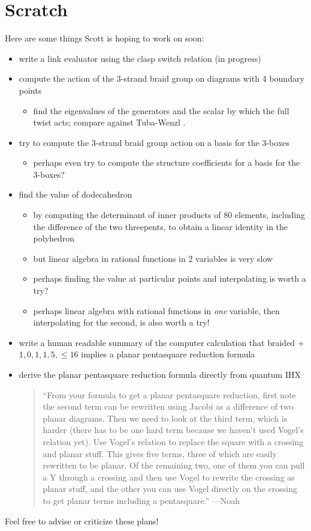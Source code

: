 \documentclass[12pt]{amsart}
\begin{document}
\section{Scratch}
Here are some things Scott is hoping to work on soon:
\begin{itemize}
\item write a link evaluator using the clasp switch relation (in progress)
\item compute the action of the 3-strand braid group on diagrams with 4
boundary points
\begin{itemize}
\item find the eigenvalues of the generators and the scalar by which the full twist
acts; compare against Tuba-Wenzl \cite{MR1815266}.
\end{itemize}
\item try to compute the 3-strand braid group action on a basis for the 3-boxes
\begin{itemize}
\item perhaps even try to compute the structure coefficients for a basis for
the 3-boxes?
\end{itemize}
\item find the value of dodecahedron
\begin{itemize}
\item by computing the determinant of inner
products of 80 elements, including the difference of the two threepents, to
obtain a linear identity in the polyhedron
\item but linear algebra in
rational functions in 2 variables is very slow
\item perhaps finding the value at particular points and interpolating is worth
a try?
\item perhaps linear algebra with rational functions in \emph{one} variable,
then interpolating for the second, is also worth a try!
\end{itemize}
\item write a human readable summary of the computer calculation that braided +
$1,0,1,1,5,\leq16$ implies a planar pentasquare reduction formula
\item derive the planar pentasquare reduction formula directly from quantum IHX
\begin{quote}
``From your formula to get a planar pentasquare reduction, first note the second term can be rewritten using Jacobi as a difference of two planar diagrams.  Then we need to look at the third term, which is harder (there has to be one hard term because we haven't used Vogel's relation yet).  Use Vogel's relation to replace the square with a crossing and planar stuff.  This gives five terms,  three of which are easily rewritten to be planar.  Of the remaining two, one of them you can pull a Y through a crossing and then use Vogel to rewrite the crossing as planar stuff, and the other you can use Vogel directly on the crossing to get planar terms including a pentasquare.''
---Noah
\end{quote}
\end{itemize}
Feel free to advise or criticize these plans!



\end{document}
